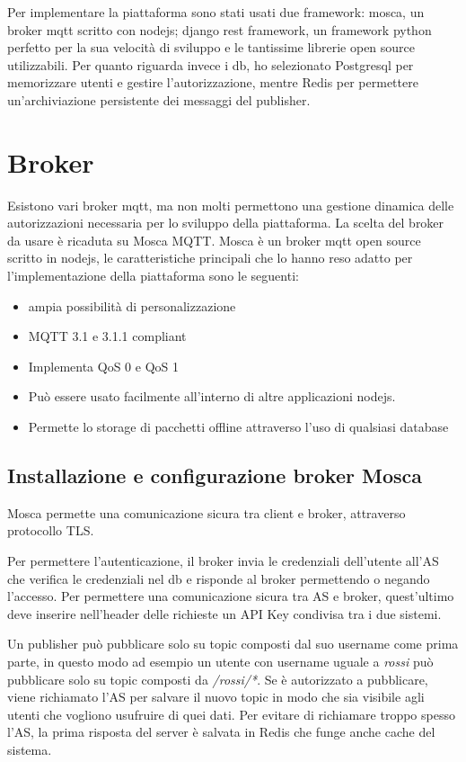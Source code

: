 Per implementare la piattaforma sono stati usati due framework: mosca, un broker mqtt scritto con nodejs; django rest framework, un framework python perfetto per la sua velocità di sviluppo e le tantissime librerie open source utilizzabili. Per quanto riguarda invece i db, ho selezionato Postgresql per memorizzare utenti e gestire l'autorizzazione, mentre Redis per permettere un'archiviazione persistente dei messaggi del publisher.

\newpage
\section{Broker}
Esistono vari broker mqtt, ma non molti permettono una gestione dinamica delle autorizzazioni necessaria per lo sviluppo della piattaforma. La scelta del broker da usare è ricaduta su Mosca MQTT. Mosca è un broker mqtt open source scritto in nodejs, le caratteristiche principali che lo hanno reso adatto per l'implementazione della piattaforma sono le seguenti:
\begin{itemize}
\item ampia possibilità di personalizzazione
\item MQTT 3.1 e 3.1.1 compliant
\item Implementa QoS 0 e QoS 1
\item Può essere usato facilmente all'interno di altre applicazioni nodejs.
\item Permette lo storage di pacchetti offline attraverso l'uso di qualsiasi database
\end{itemize}
\subsection{Installazione e configurazione broker Mosca}
Mosca permette una comunicazione sicura tra client e broker, attraverso protocollo TLS.

Per permettere l'autenticazione, il broker invia le credenziali dell'utente all'AS che verifica le credenziali nel db e risponde al broker permettendo o negando l'accesso.
Per permettere una comunicazione sicura tra AS e broker, quest'ultimo deve inserire nell'header delle richieste un API Key condivisa tra i due sistemi.

Un publisher può pubblicare solo su topic composti dal suo username come prima parte, in questo modo ad esempio un utente con username uguale a \textit{rossi} può pubblicare solo su topic composti da \textit{/rossi/*}.
Se è autorizzato a pubblicare, viene richiamato l'AS per salvare il nuovo topic in modo che sia visibile agli utenti che vogliono usufruire di quei dati.
Per evitare di richiamare troppo spesso l'AS, la prima risposta del server è salvata in Redis che funge anche cache del sistema.

